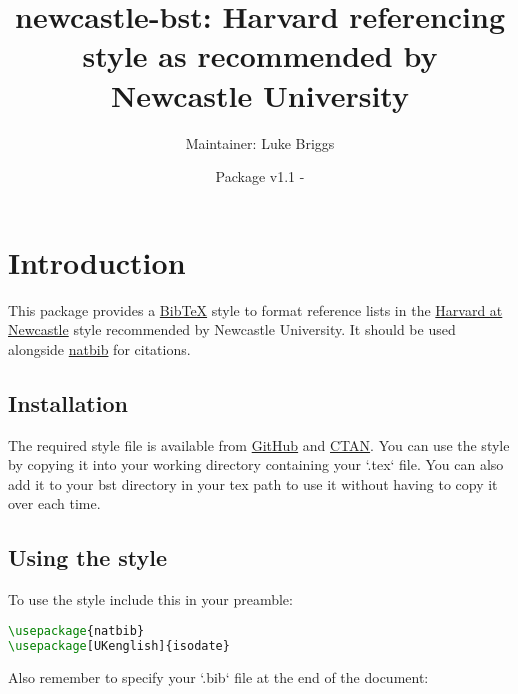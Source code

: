 \documentclass{article}
\begin{document}
\title{newcastle-bst: Harvard referencing style as recommended by Newcastle University}
\author{Maintainer: Luke Briggs}
\date{Package v1.1 - }
\maketitle

\section{Introduction}
This package provides a \href{https://ctan.org/pkg/BibTeX}{BibTeX} style to format reference lists in the \href{https://libguides.ncl.ac.uk/managing/harvard}{Harvard at Newcastle} style recommended by Newcastle University. 
It should be used alongside \href{https://ctan.org/pkg/natbib}{natbib} for citations.

\subsection{Installation}
The required style file is available from \href{https://github.com/LukeBriggsDev/Newcastle-BibTeX}{GitHub} and \href{https://ctan.org/pkg/newcastle-bst}{CTAN}. 
You can use the style by copying it into your working directory containing your `.tex` file. 
You can also add it to your bst directory in your tex path to use it without having to copy it over each time.

\subsection{Using the style}
To use the style include this in your preamble:
\begin{lstlisting}[language=tex]
\usepackage{natbib}
\usepackage[UKenglish]{isodate}

\end{lstlisting}

Also remember to specify your `.bib` file at the end of the document:
\begin{lstlisting}[language=tex]

\end{lstlisting}
\end{document}
